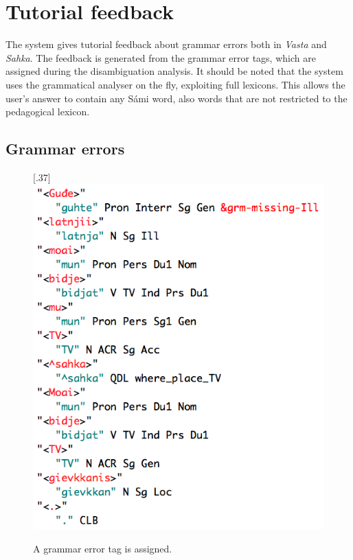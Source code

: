 \documentclass[11pt]{article}
\begin{document}
\section{Tutorial feedback} \label{tutorial}
The system gives tutorial feedback about grammar errors both in \textit{Vasta} and \textit{Sahka}. The feedback is generated from the grammar error tags, which are assigned during the disambiguation analysis. It should be noted that the system uses the grammatical analyser on the fly, exploiting full lexicons. This allows the user's answer to contain any Sámi word, also words that are not restricted to the pedagogical lexicon.

\subsection{Grammar errors} \label{grammarerrors}

\begin{figure}[htbp]
\begin{center}
\scalebox{.37}[.37]{\includegraphics{presentation/img/gievkkanisAnalEng.png}}\\
\caption{A grammar error tag is assigned. }
\label{hivssetloc}
\end{center}
\end{figure}
\end{document}

